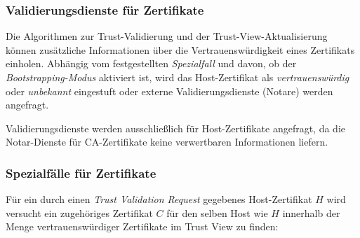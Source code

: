 \documentclass[accentcolor=tud1c,article,colorback,11pt]{tudreport}
\begin{document}
\subsubsection{Validierungsdienste für Zertifikate}

Die Algorithmen zur Trust-Validierung und der Trust-View-Aktualisierung können zusätzliche Informationen über die Vertrauenswürdigkeit eines Zertifikats einholen. Abhängig vom festgestellten \emph{Spezialfall} und davon, ob der \emph{Bootstrapping-Modus} aktiviert ist, wird das Host-Zertifikat als \emph{vertrauenswürdig} oder \emph{unbekannt} eingestuft oder externe Validierungsdienste (Notare) werden angefragt.

Validierungsdienste werden ausschließlich für Host-Zertifikate angefragt, da die Notar-Dienste für CA-Zertifikate keine verwertbaren Informationen liefern.

\subsubsection{Spezialfälle für Zertifikate}

Für ein durch einen \emph{Trust Validation Request} gegebenes Host-Zertifikat $H$ wird versucht ein zugehöriges Zertifikat $C$ für den selben Host wie $H$ innerhalb der Menge vertrauenswürdiger Zertifikate im Trust View zu finden:
\end{document}
